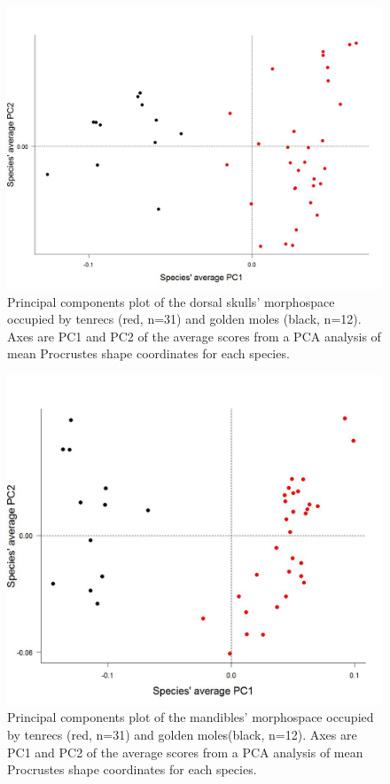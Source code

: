 \documentclass[12pt,a4paper]{article}
\begin{document}
	
\begin{figure}[H]
\centering
\includegraphics[width=1\linewidth]{figures/SkDors_Tenrecs+Gmoles_PC1PC2_01_05.jpg}
\caption{Principal components plot of the dorsal skulls' morphospace occupied by tenrecs (red, n=31) and golden moles (black, n=12). Axes are PC1 and PC2 of the average scores from a PCA analysis of mean Procrustes shape coordinates for each species. }
\label{fig:skdorsPCA}
\end{figure}


\begin{figure}[H]
\centering
\includegraphics[width=1\linewidth]{figures/Mands_Tenrecs+Gmoles_PC1PC2_01_05_14.jpg}
\caption{Principal components plot of the mandibles' morphospace occupied by tenrecs (red, n=31) and golden moles(black, n=12). Axes are PC1 and PC2 of the average scores from a PCA analysis of mean Procrustes shape coordinates for each species. }
\label{fig:mandsPCA}

\end{figure}
\end{document}
